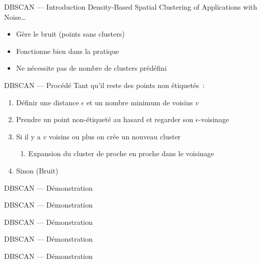 
\begin{frame}{DBSCAN --- Introduction}
  Density-Based Spatial Clustering of Applications with Noise…

  \begin{itemize}[<+->]
    \item Gère le bruit (points sans clusters)
    \item Fonctionne bien dans la pratique
    \item Ne nécessite pas de nombre de clusters prédéfini
  \end{itemize}
\end{frame}

\begin{frame}{DBSCAN --- Procédé}
  Tant qu'il reste des points non étiquetés~:

  \begin{enumerate}
  \item Définir une distance $\epsilon$ et un nombre minimum de voisins $v$
  \item Prendre un point non-étiqueté au hasard et regarder son $\epsilon$-voisinage
  \item Si il y a $v$ voisins ou plus on crée un nouveau cluster
    \begin{enumerate}
    \item Expansion du cluster de proche en proche dans le voisinage
    \end{enumerate}
  \item Sinon (Bruit)
  \end{enumerate}
\end{frame}

\begin{frame}{DBSCAN --- Démonstration}
\end{frame}

\begin{frame}{DBSCAN --- Démonstration}
\end{frame}

\begin{frame}{DBSCAN --- Démonstration}
\end{frame}

\begin{frame}{DBSCAN --- Démonstration}
\end{frame}

\begin{frame}{DBSCAN --- Démonstration}
\end{frame}

